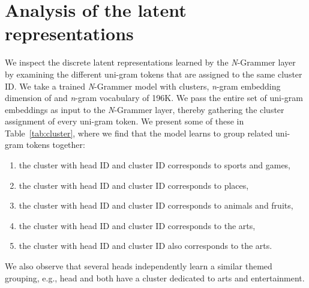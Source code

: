 \documentclass[11pt]{article}
\begin{document}
\section{Analysis of the latent representations}\label{sec:latent_rep}
We inspect the discrete latent representations learned by the \textit{N}-Grammer layer by
examining the different uni-gram tokens that are assigned to the same cluster ID. 
We take a trained \textit{N}-Grammer model with  clusters, \textit{n}-gram embedding
dimension of  and \textit{n}-gram vocabulary of 196K.
We pass the entire set of  uni-gram embeddings as input to the \textit{N}-Grammer layer, 
thereby gathering the cluster assignment of every uni-gram token.
We present some of these in Table~\ref{tab:cluster},
where we find that the model learns to group related uni-gram tokens together:
\begin{enumerate}
\item the cluster with head ID  and cluster ID  corresponds to sports and games,

\item the cluster with head ID  and cluster ID  corresponds to places,

\item the cluster with head ID  and cluster ID  corresponds to animals and fruits,

\item the cluster with head ID  and cluster ID  corresponds to the arts,

\item the cluster with head ID  and cluster ID  also corresponds to the arts.
\end{enumerate}
We also observe that several heads independently learn a similar themed grouping, e.g., head  and
 both have a cluster dedicated to arts and entertainment.
\setlength{\arrayrulewidth}{0.5mm}
\setlength{\tabcolsep}{18pt}
\renewcommand{\arraystretch}{1.5}
\end{document}
